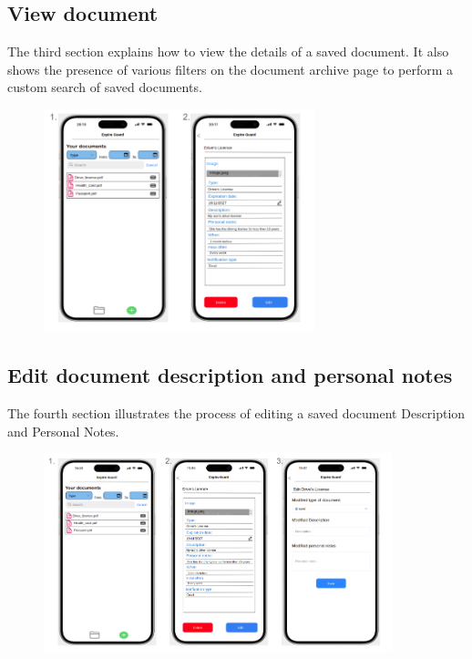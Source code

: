 	\subsection{View document}
		The third section explains how to view the details of a saved document. It also shows the presence of various filters on the document archive page to perform a custom search of saved documents.
		\begin{figure}[htbp]
			\centering
			\includegraphics[width=0.7\textwidth]{../mockups/view_doc.png}  %
		\end{figure}
		\clearpage
	\subsection{Edit document description and personal notes}
		The fourth section illustrates the process of editing a saved document Description and Personal Notes.
		\begin{figure}[htbp]
			\centering
			\includegraphics[width=0.9\textwidth]{../mockups/edit_doc_meta_1.png}  %
		\end{figure}
	
